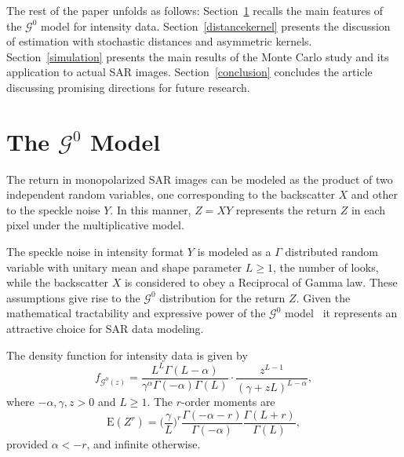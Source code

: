 \documentclass[twocolumn]{svjour3}
\begin{document}
	
	The rest of the paper unfolds as follows: 
	Section~\ref{sec_SAR} recalls the main features of the $\mathcal{G}^0$ model for intensity data.
	Section~\ref{distancekernel} presents the discussion of estimation with stochastic distances and asymmetric kernels. 
	Section~\ref{simulation} presents the main results of the Monte Carlo study and its application to actual SAR images.
	Section~\ref{conclusion} concludes the article discussing promising directions for future research.
	
	\section{The $\mathcal{G}^0$ Model}
	\label{sec_SAR}
	
	The return in monopolarized SAR images can be modeled as the product of two independent random variables, one corresponding to the backscatter $X$ and other to the speckle noise $Y$. 
	In this manner, $Z=X Y  $ represents the return $Z$ in each pixel under the multiplicative model.
	
	The speckle noise in intensity format $Y$ is modeled as a $\Gamma$ distributed random variable with unitary mean and shape parameter $L\geq1$, the number of looks, while the backscatter $X$ is considered to obey a Reciprocal of Gamma law. 
	These assumptions give rise to the $\mathcal{G}^{0}$ distribution for the return $Z$.
	Given the mathematical tractability and expressive power of the $\mathcal{G}^{0}$ model~\cite{MejailJacoboFreryBustos:IJRS,mejailfreryjacobobustos2001} it represents an attractive choice for SAR data modeling.
	
	The density function for intensity data is given by
	\begin{equation}
	f_{\mathcal{G}^{0}(z)} =\frac{L^{L}\Gamma ( L-\alpha
		) }{\gamma ^{\alpha }\Gamma ( -\alpha ) \Gamma (
		L) }\cdot  
	\frac{z^{L-1}}{( \gamma +zL) ^{L-\alpha }},%
	\label{ec_dens_gI0}
	\end{equation}
	where $-\alpha,\gamma ,z>0$ and $L\geq 1$. 
	The $r$-order moments are
	\begin{equation}
	\text{E}(Z^r) =\Big(\frac{\gamma}{L}\Big)^r\frac{\Gamma ( -\alpha-r )}{ \Gamma (-\alpha) }
	\frac{\Gamma (L+r )}{\Gamma (L)},
	\label{moments_gI0}
	\end{equation}
	provided $\alpha<-r$, and infinite otherwise.
	
\end{document}
